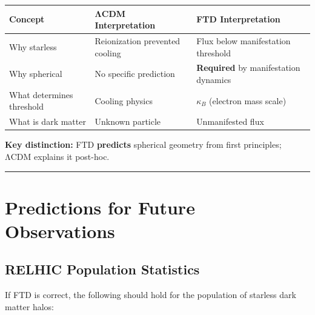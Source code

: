 \documentclass[
  11pt,
  letterpaper,
  twoside,
  openany]{book}
\makeatletter
\let\orig@section\section
\renewcommand{\section}{\needspace{8\baselineskip}\orig@section}
\let\orig@subsection\subsection
\renewcommand{\subsection}{\needspace{6\baselineskip}\orig@subsection}
\makeatother
\begin{document}
\begin{longtable}[]{@{}
  >{\raggedright\arraybackslash}p{}
  >{\raggedright\arraybackslash}p{}
  >{\raggedright\arraybackslash}p{}@{}}
\toprule\noalign{}
\begin{minipage}[b]{\linewidth}\raggedright
Concept
\end{minipage} & \begin{minipage}[b]{\linewidth}\raggedright
ΛCDM Interpretation
\end{minipage} & \begin{minipage}[b]{\linewidth}\raggedright
FTD Interpretation
\end{minipage} \\
\midrule\noalign{}
\endhead
\bottomrule\noalign{}
\endlastfoot
Why starless & Reionization prevented cooling & Flux below manifestation
threshold \\
Why spherical & No specific prediction & \textbf{Required} by
manifestation dynamics \\
What determines threshold & Cooling physics & \(\kappa_B\) (electron
mass scale) \\
What is dark matter & Unknown particle & Unmanifested flux \\
\end{longtable}

\textbf{Key distinction:} FTD \textbf{predicts} spherical geometry from
first principles; ΛCDM explains it post-hoc.

\begin{center}\rule{0.5\linewidth}{0.5pt}\end{center}

\section{Predictions for Future Observations}\label{sec-future-obs}

\subsection{RELHIC Population
Statistics}\label{relhic-population-statistics}

If FTD is correct, the following should hold for the population of
starless dark matter halos:
\end{document}
